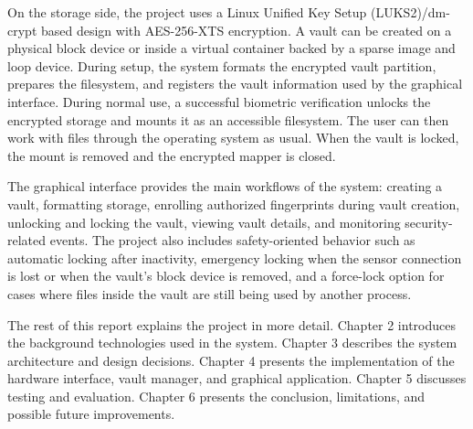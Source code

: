On the storage side, the project uses a Linux Unified Key Setup (LUKS2)/dm-crypt based design with AES-256-XTS encryption. A vault can be created on a physical block device or inside a virtual container backed by a sparse image and loop device. During setup, the system formats the encrypted vault partition, prepares the filesystem, and registers the vault information used by the graphical interface. During normal use, a successful biometric verification unlocks the encrypted storage and mounts it as an accessible filesystem. The user can then work with files through the operating system as usual. When the vault is locked, the mount is removed and the encrypted mapper is closed.

The graphical interface provides the main workflows of the system: creating a vault, formatting storage, enrolling authorized fingerprints during vault creation, unlocking and locking the vault, viewing vault details, and monitoring security-related events. The project also includes safety-oriented behavior such as automatic locking after inactivity, emergency locking when the sensor connection is lost or when the vault's block device is removed, and a force-lock option for cases where files inside the vault are still being used by another process.

The rest of this report explains the project in more detail. Chapter 2 introduces the background technologies used in the system. Chapter 3 describes the system architecture and design decisions. Chapter 4 presents the implementation of the hardware interface, vault manager, and graphical application. Chapter 5 discusses testing and evaluation. Chapter 6 presents the conclusion, limitations, and possible future improvements.
